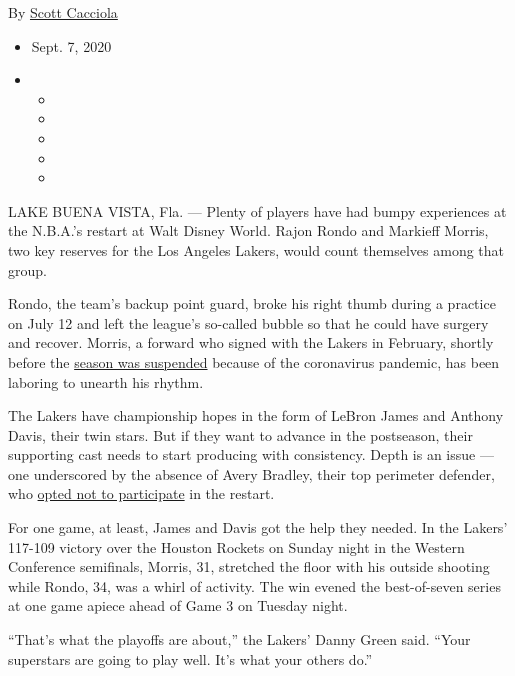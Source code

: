 By \href{https://www.nytimes3xbfgragh.onion/by/scott-cacciola}{Scott
Cacciola}

\begin{itemize}
\item
  Sept. 7, 2020
\item
  \begin{itemize}
  \item
  \item
  \item
  \item
  \item
  \end{itemize}
\end{itemize}

LAKE BUENA VISTA, Fla. --- Plenty of players have had bumpy experiences
at the N.B.A.'s restart at Walt Disney World. Rajon Rondo and Markieff
Morris, two key reserves for the Los Angeles Lakers, would count
themselves among that group.

Rondo, the team's backup point guard, broke his right thumb during a
practice on July 12 and left the league's so-called bubble so that he
could have surgery and recover. Morris, a forward who signed with the
Lakers in February, shortly before the
\href{https://www.nytimes3xbfgragh.onion/2020/03/11/sports/basketball/nba-season-suspended-coronavirus.html}{season
was suspended} because of the coronavirus pandemic, has been laboring to
unearth his rhythm.

The Lakers have championship hopes in the form of LeBron James and
Anthony Davis, their twin stars. But if they want to advance in the
postseason, their supporting cast needs to start producing with
consistency. Depth is an issue --- one underscored by the absence of
Avery Bradley, their top perimeter defender, who
\href{https://www.nytimes3xbfgragh.onion/2020/07/03/sports/coronavirus-players-nba-mlb-opt-out.html}{opted
not to participate} in the restart.

For one game, at least, James and Davis got the help they needed. In the
Lakers' 117-109 victory over the Houston Rockets on Sunday night in the
Western Conference semifinals, Morris, 31, stretched the floor with his
outside shooting while Rondo, 34, was a whirl of activity. The win
evened the best-of-seven series at one game apiece ahead of Game 3 on
Tuesday night.

``That's what the playoffs are about,'' the Lakers' Danny Green said.
``Your superstars are going to play well. It's what your others do.''

